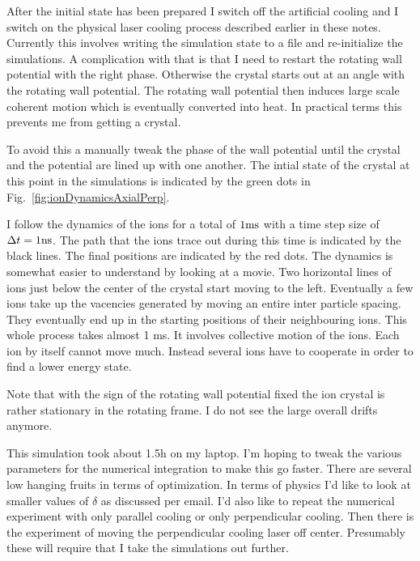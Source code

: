\documentclass[
  aps,
  reprint,
  twoside,
  showpacs,
  amsmath,
  amssymb,
  floatfix
]{revtex4-1}
\begin{document}
After the initial state has been prepared I switch off the artificial
cooling and I switch on the physical laser cooling process described
earlier in these notes.  Currently this involves writing the simulation
state to a file and re-initialize the simulations.  A complication with
that is that I need to restart the rotating wall potential with the
right phase.  Otherwise the crystal starts out at an angle with the
rotating wall potential.  The rotating wall potential then induces large
scale coherent motion which is eventually converted into heat.
In practical terms this prevents me from getting a crystal.

To avoid this a manually tweak the phase of the wall potential until the
crystal and the potential are lined up with one another.  The intial
state of the crystal at this point in the simulations is indicated by
the green dots in Fig.~\ref{fig:ionDynamicsAxialPerp}.

I follow the dynamics of the ions for a total of $1{\rm ms}$ with a time step
size of $\Delta t=1{\rm ns}$.  The path that the ions trace out during
this time is indicated by the black lines.  The final positions are
indicated by the red dots.  The dynamics is somewhat easier to
understand by looking at a movie.  Two horizontal lines of ions just
below the center of the crystal start moving to the left.  Eventually a
few ions take up the vacencies generated by moving an entire
inter particle spacing.  They eventually end up in the starting
positions of their neighbouring ions.  This whole process takes almost 1
ms.  It involves collective motion of the ions.  Each ion by itself
cannot move much.  Instead several ions have to cooperate in order to
find a lower energy state.

Note that with the sign of the rotating wall potential fixed the ion
crystal is rather stationary in the rotating frame.  I do not see the
large overall drifts anymore.

This simulation took about 1.5h on my laptop.  I'm hoping to tweak the
various parameters for the numerical integration to make this go faster.
There are several low hanging fruits in terms of optimization.  In terms
of physics I'd like to look at smaller values of $\delta$ as discussed
per email.  I'd also like to repeat the numerical experiment with only
parallel cooling or only perpendicular cooling.  Then there is the
experiment of moving the perpendicular cooling laser off center.
Presumably these will require that I take the simulations out further.
\end{document}
